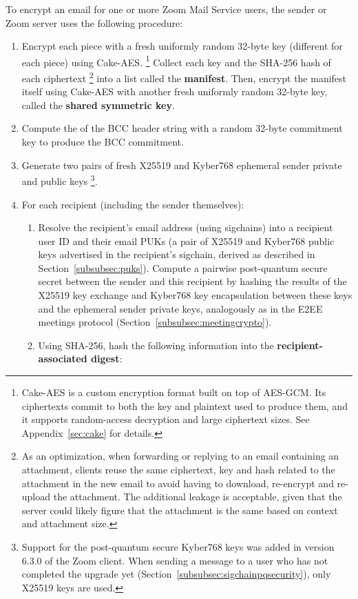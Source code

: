 To encrypt an email for one or more Zoom Mail Service users, the sender or Zoom server uses the
following procedure:
\begin{enumerate}
\item Encrypt each piece with a fresh uniformly random 32-byte key (different for each piece) using
Cake-AES.%
%
\footnote{Cake-AES is a custom encryption format built on top of AES-GCM. Its ciphertexts commit to
both the key and plaintext used to produce them, and it supports random-access decryption and large
ciphertext sizes. See Appendix~\ref{sec:cake} for details.} %
%
Collect each key and the SHA-256 hash of each ciphertext%
%
\footnote{As an optimization, when forwarding or replying to an email containing an attachment,
clients reuse the same ciphertext, key and hash related to the attachment in the new email to avoid
having to download, re-encrypt and re-upload the attachment. The additional leakage is acceptable,
given that the server could likely figure that the attachment is the same based on context and
attachment size.}
%
into a list called the \textbf{manifest}. Then, encrypt the manifest itself using Cake-AES with
another fresh uniformly random 32-byte key, called the \textbf{shared symmetric key}.
\item Compute the \HMACSHATWO of the BCC header string with a random 32-byte commitment key to
produce the BCC commitment.
\item Generate two pairs of fresh X25519 and Kyber768 ephemeral sender private and public
keys%
%
\footnote{Support for the post-quantum secure Kyber768 keys was added in version 6.3.0 of the
Zoom client. When sending a message to a user who has not completed the upgrade yet
(Section~\ref{subsubsec:sigchainpqsecurity}), only X25519 keys are used.}.
%
\item For each recipient (including the sender themselves):
\begin{enumerate}
\item Resolve the recipient's email address (using sigchains) into a recipient user ID and their
email PUKs (a pair of X25519 and Kyber768 public keys advertised in the recipient's sigchain,
derived as described in Section~\ref{subsubsec:puks}). Compute a pairwise post-quantum secure secret
between the sender and this recipient by hashing the results of the X25519 key exchange and Kyber768
key encapsulation between these keys and the ephemeral sender private keys, analogously as in the
E2EE meetings protocol (Section~\ref{subsubsec:meetingcrypto}).
\item Using SHA-256, hash the following information into the \textbf{recipient-associated digest}:

\end{enumerate}
\end{enumerate}
